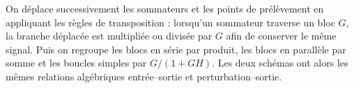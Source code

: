 \begin{corrigebox}
On déplace successivement les sommateurs et les points de prélèvement
        en appliquant les règles de transposition : lorsqu'un sommateur traverse un bloc
        $G$, la branche déplacée est multipliée ou divisée par $G$ afin de conserver le
        même signal. Puis on regroupe les blocs en série par produit, les blocs en
        parallèle par somme et les boucles simples par $G/(1+GH)$. Les deux schémas ont
        alors les mêmes relations algébriques entrée--sortie et perturbation--sortie.
\end{corrigebox}
